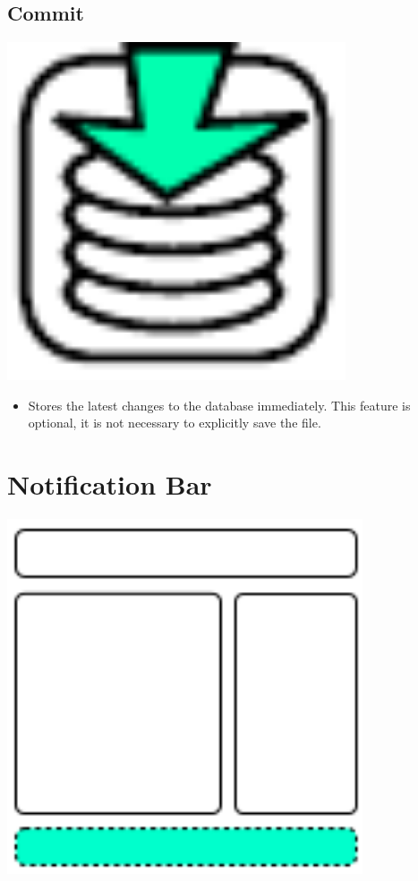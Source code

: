 \subsection{Commit}

\includegraphics[width=10cm]{../../gui/source/resources/edit_commit.pdf}
\begin{itemize}
\item Stores the latest changes to the database immediately. This feature is optional, it is not necessary to explicitly save the file.
\end{itemize}

\section{Notification Bar}

\includegraphics[height=10.5cm]{main_window_sketch_4.png}

